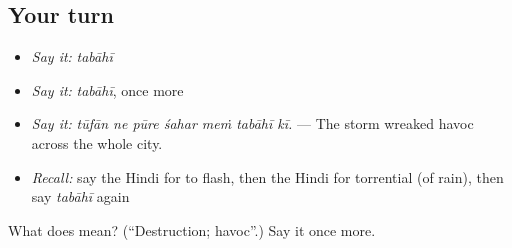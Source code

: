 \subsection*{Your turn}
\begin{itemize}
\raggedright
  \item \emph{Say it:} \emph{tabāhī}
  \item \emph{Say it:} \emph{tabāhī}, once more
  \item \emph{Say it:} \emph{tūfān ne pūre śahar meṁ tabāhī kī.} — The storm wreaked havoc across the whole city.
  \item \emph{Recall:} say the Hindi for to flash, then the Hindi for torrential (of rain), then say \emph{tabāhī} again
\end{itemize}

\begin{tcolorbox}[breakable,colback=teal!4,colframe=teal!35!black,title={Before you move on}]
What does  mean? (\textquotedblleft{}Destruction; havoc\textquotedblright{}.) Say it once more.
\end{tcolorbox}
